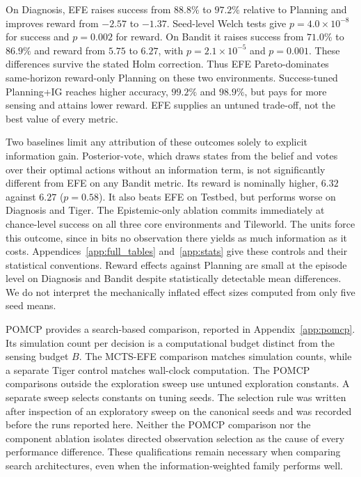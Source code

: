 \documentclass[manuscript, screen, review]{jair}
\begin{document}
On Diagnosis, EFE raises success from $88.8\%$ to $97.2\%$ relative to Planning and improves reward from $-2.57$ to $-1.37$. Seed-level Welch tests give $p=4.0{\times}10^{-8}$ for success and $p=0.002$ for reward. On Bandit it raises success from $71.0\%$ to $86.9\%$ and reward from $5.75$ to $6.27$, with $p=2.1{\times}10^{-5}$ and $p=0.001$. These differences survive the stated Holm correction. Thus EFE Pareto-dominates same-horizon reward-only Planning on these two environments. Success-tuned Planning+IG reaches higher accuracy, $99.2\%$ and $98.9\%$, but pays for more sensing and attains lower reward. EFE supplies an untuned trade-off, not the best value of every metric.

Two baselines limit any attribution of these outcomes solely to explicit information gain. Posterior-vote, which draws states from the belief and votes over their optimal actions without an information term, is not significantly different from EFE on any Bandit metric. Its reward is nominally higher, $6.32$ against $6.27$ ($p=0.58$). It also beats EFE on Testbed, but performs worse on Diagnosis and Tiger. The Epistemic-only ablation commits immediately at chance-level success on all three core environments and Tileworld. The units force this outcome, since in bits no observation there yields as much information as it costs. Appendices~\ref{app:full_tables} and~\ref{app:stats} give these controls and their statistical conventions. Reward effects against Planning are small at the episode level on Diagnosis and Bandit despite statistically detectable mean differences. We do not interpret the mechanically inflated effect sizes computed from only five seed means.

POMCP provides a search-based comparison, reported in Appendix~\ref{app:pomcp}. Its simulation count per decision is a computational budget distinct from the sensing budget $B$. The MCTS-EFE comparison matches simulation counts, while a separate Tiger control matches wall-clock computation. The POMCP comparisons outside the exploration sweep use untuned exploration constants. A separate sweep selects constants on tuning seeds. The selection rule was written after inspection of an exploratory sweep on the canonical seeds and was recorded before the runs reported here. Neither the POMCP comparison nor the component ablation isolates directed observation selection as the cause of every performance difference. These qualifications remain necessary when comparing search architectures, even when the information-weighted family performs well.
\end{document}
